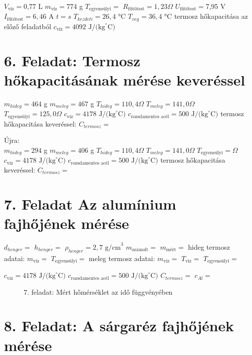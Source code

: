 \documentclass{article}
\begin{document}
$V_{\text{víz}}=$0,77 L
$m_{\text{víz}}=$774 g
$T_{\text{egyensúlyi}}=$
$R_{\text{fűtőtest}}=1,23 \Omega$
$U_{\text{fűtőtest}}=$7,95 V
$I_{\text{fűtőtest}}=6,46$ A
$t=s$
$T_{kezdeti}=26,4$ °C
$T_{veg}=36,4$ °C
termosz hőkapacitása az előző feladatból
$c_{\text{víz}}=4092 \text{ J/(kg}^{\circ}\text{C)}$


\section*{6. Feladat: Termosz hőkapacitásának mérése keveréssel}

$m_{hideg}=464$ g
$m_{meleg}=467$ g
$T_{hideg}=110,4 \Omega$
$T_{meleg}=141,0 \Omega$
$T_{\text{egyensúlyi}}=125,0 \Omega$
$c_{\text{víz}}= 4178 \text{ J/(kg}^{\circ}\text{C)}$   %
$c_{\text{rozsdamentes acél}}=500 \text{ J/(kg}^{\circ}\text{C)}$
termosz hőkapacitása keveréssel: $C_{termosz}=$

Újra:\\
$m_{hideg}=294$ g
$m_{meleg}=406$ g
$T_{hideg}=110,4 \Omega$
$T_{meleg}=141,0 \Omega$
$T_{\text{egyensúlyi}}= \Omega$
$c_{\text{víz}}= 4178 \text{ J/(kg}^{\circ}\text{C)}$   %
$c_{\text{rozsdamentes acél}}=500 \text{ J/(kg}^{\circ}\text{C)}$
termosz hőkapacitása keveréssel: $C_{termosz}=$



\section*{7. Feladat Az alumínium fajhőjének mérése}

$d_{henger}=$
$h_{henger}=$
$\rho_{henger}=2,7 \text{ g/cm}^3$
$m_{\text{számolt}}=$
$m_{\text{mért}}=$
hideg termosz adatai:
$m_{\text{víz}}=$
$T_{\text{egyensúlyi}}=$
meleg termosz adatai:
$m_{\text{víz}}=$
$T_{\text{víz}}=$
$T_{\text{egyensúlyi}}=$

$c_{\text{víz}}= 4178 \text{ J/(kg}^{\circ}\text{C)}$   %
$c_{\text{rozsdamentes acél}}=500 \text{ J/(kg}^{\circ}\text{C)}$
$C_{termosz}=$
$c_{Al}=$

\begin{figure}[H]
    \centering
    \caption*{7. feladat: Mért hőmérséklet az idő függvényében}
    \label{}
\end{figure}

\section*{8. Feladat: A sárgaréz fajhőjének mérése}
\end{document}
